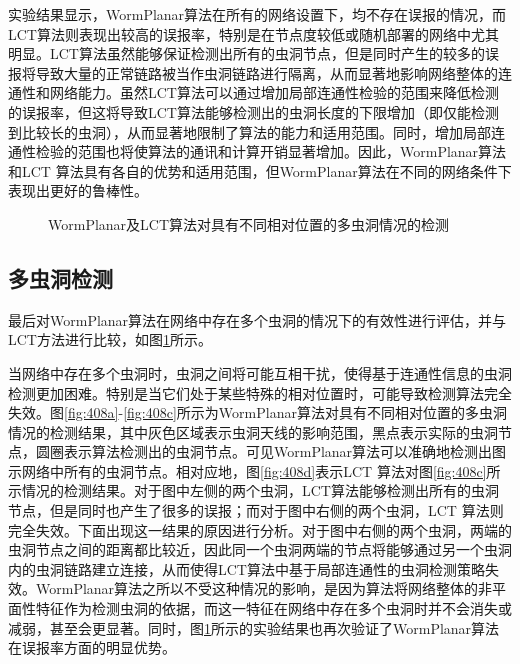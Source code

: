实验结果显示，WormPlanar算法在所有的网络设置下，均不存在误报的情况，而LCT算法则表现出较高的误报率，特别是在节点度较低或随机部署的网络中尤其明显。LCT算法虽然能够保证检测出所有的虫洞节点，但是同时产生的较多的误报将导致大量的正常链路被当作虫洞链路进行隔离，从而显著地影响网络整体的连通性和网络能力。虽然LCT算法可以通过增加局部连通性检验的范围来降低检测的误报率，但这将导致LCT算法能够检测出的虫洞长度的下限增加（即仅能检测到比较长的虫洞），从而显著地限制了算法的能力和适用范围。同时，增加局部连通性检验的范围也将使算法的通讯和计算开销显著增加。因此，WormPlanar算法和LCT 算法具有各自的优势和适用范围，但WormPlanar算法在不同的网络条件下表现出更好的鲁棒性。
\begin{figure}[t]
  \centering
  \hspace{0.5em}%
  \hspace{0.5em}%
  \hspace{0.5em}%
  \caption{WormPlanar及LCT算法对具有不同相对位置的多虫洞情况的检测}
  \label{fig:408}
\end{figure}

\subsection{多虫洞检测}
最后对WormPlanar算法在网络中存在多个虫洞的情况下的有效性进行评估，并与LCT方法进行比较，如图\ref{fig:408}所示。

当网络中存在多个虫洞时，虫洞之间将可能互相干扰，使得基于连通性信息的虫洞检测更加困难。特别是当它们处于某些特殊的相对位置时，可能导致检测算法完全失效。图\ref{fig:408a}-\ref{fig:408c}所示为WormPlanar算法对具有不同相对位置的多虫洞情况的检测结果，其中灰色区域表示虫洞天线的影响范围，黑点表示实际的虫洞节点，圆圈表示算法检测出的虫洞节点。可见WormPlanar算法可以准确地检测出图示网络中所有的虫洞节点。相对应地，图\ref{fig:408d}表示LCT 算法对图\ref{fig:408c}所示情况的检测结果。对于图中左侧的两个虫洞，LCT算法能够检测出所有的虫洞节点，但是同时也产生了很多的误报；而对于图中右侧的两个虫洞，LCT 算法则完全失效。下面出现这一结果的原因进行分析。对于图中右侧的两个虫洞，两端的虫洞节点之间的距离都比较近，因此同一个虫洞两端的节点将能够通过另一个虫洞内的虫洞链路建立连接，从而使得LCT算法中基于局部连通性的虫洞检测策略失效。WormPlanar算法之所以不受这种情况的影响，是因为算法将网络整体的非平面性特征作为检测虫洞的依据，而这一特征在网络中存在多个虫洞时并不会消失或减弱，甚至会更显著。同时，图\ref{fig:408}所示的实验结果也再次验证了WormPlanar算法在误报率方面的明显优势。
